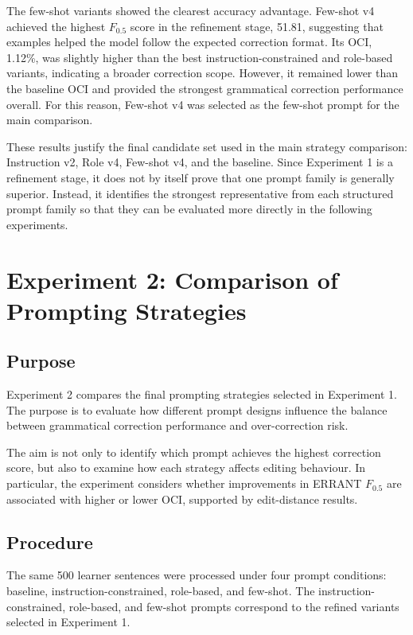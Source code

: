 The few-shot variants showed the clearest accuracy advantage. Few-shot v4 achieved the highest $F_{0.5}$ score in the refinement stage, 51.81, suggesting that examples helped the model follow the expected correction format. Its OCI, 1.12\%, was slightly higher than the best instruction-constrained and role-based variants, indicating a broader correction scope. However, it remained lower than the baseline OCI and provided the strongest grammatical correction performance overall. For this reason, Few-shot v4 was selected as the few-shot prompt for the main comparison.

These results justify the final candidate set used in the main strategy comparison: Instruction v2, Role v4, Few-shot v4, and the baseline. Since Experiment 1 is a refinement stage, it does not by itself prove that one prompt family is generally superior. Instead, it identifies the strongest representative from each structured prompt family so that they can be evaluated more directly in the following experiments.

\section{Experiment 2: Comparison of Prompting Strategies}

\subsection{Purpose}

Experiment 2 compares the final prompting strategies selected in Experiment 1. The purpose is to evaluate how different prompt designs influence the balance between grammatical correction performance and over-correction risk.

The aim is not only to identify which prompt achieves the highest correction score, but also to examine how each strategy affects editing behaviour. In particular, the experiment considers whether improvements in ERRANT $F_{0.5}$ are associated with higher or lower OCI, supported by edit-distance results.

\subsection{Procedure}

The same 500 learner sentences were processed under four prompt conditions: baseline, instruction-constrained, role-based, and few-shot. The instruction-constrained, role-based, and few-shot prompts correspond to the refined variants selected in Experiment 1.

